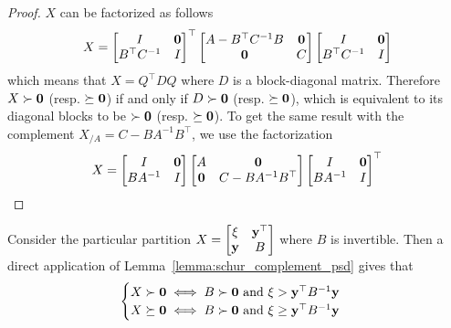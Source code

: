 \begin{proof}
    $X$ can be factorized as follows
    \begin{equation*}
        X = \begin{bmatrix}
                I & \mathbf{0}\\
                B^\top C^{-1} & I
        \end{bmatrix}^\top
        \begin{bmatrix}
            A - B^\top C^{-1}B & \mathbf{0}\\
            \mathbf{0} & C
        \end{bmatrix}
        \begin{bmatrix}
            I & \mathbf{0}\\
            B^\top C^{-1} & I
        \end{bmatrix}
    \end{equation*}
    which means that $X = Q^\top D Q$ where $D$ is a block-diagonal matrix.
    Therefore $X \succ \mathbf{0}$ (resp. $\succeq \mathbf{0}$) if and only if $D \succ \mathbf{0}$ (resp. $\succeq \mathbf{0}$),
    which is equivalent to its diagonal blocks to be $\succ \mathbf{0}$ (resp. $\succeq \mathbf{0}$).
    To get the same result with the complement $X_{/A} = C - B A^{-1} B^\top$,
    we use the factorization
    \begin{equation*}
        X = \begin{bmatrix}
                I & \mathbf{0}\\
                BA^{-1} & I
        \end{bmatrix}
        \begin{bmatrix}
            A & \mathbf{0}\\
            \mathbf{0} & C - BA^{-1}B^\top
        \end{bmatrix}
        \begin{bmatrix}
            I & \mathbf{0}\\
            BA^{-1} & I
        \end{bmatrix}^\top
    \end{equation*}
\end{proof}

Consider the particular partition
$X = \begin{bmatrix}
         \xi & \mathbf{y}^\top\\
         \mathbf{y} & B
\end{bmatrix}$
where $B$ is invertible.
Then a direct application of Lemma~\ref{lemma:schur_complement_psd} gives that
\begin{equation*}
    \begin{cases}
        X \succ \mathbf{0} \iff B \succ \mathbf{0} \text{ and } \xi > \mathbf{y}^\top B^{-1} \mathbf{y}\\
        X \succeq \mathbf{0} \iff B \succ \mathbf{0} \text{ and } \xi \geq \mathbf{y}^\top B^{-1} \mathbf{y}
    \end{cases}
\end{equation*}

